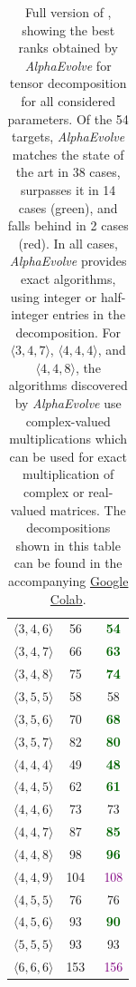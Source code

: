 \documentclass[logo,copyright,12pt]{googledeepmind}
\theoremstyle{definition}
\theoremstyle{remark}
\theoremstyle{plain}
\newcommand{\ResultsColabURL}{https://colab.research.google.com/github/google-deepmind/alphaevolve\_results/blob/master/mathematical\_results.ipynb}
\newcommand{\ResultsColab}{the accompanying \href{\ResultsColabURL}{Google Colab}}
\newcommand{\method}{\emph{AlphaEvolve}\xspace}
\begin{document}
\begin{table}[h]
\begin{center}
{\begin{tabular}{ccc}
    $\langle 3, 4, 6 \rangle$ & 56~\citep{Kauers_2025} & \textcolor{darkgreen}{\textbf{54}} \\ 
    $\langle 3, 4, 7 \rangle$ & 66~\citep{smirnov2021} & \textcolor{darkgreen}{\textbf{63}} \\ 
    $\langle 3, 4, 8 \rangle$ & 75~\citep{smirnov2021}   & \textcolor{darkgreen}{\textbf{74}} \\ 
    $\langle 3, 5, 5 \rangle$ & 58~\citep{smirnov2021} & 58 \\ 
    $\langle 3, 5, 6 \rangle$ & 70~\citep{Kauers_2025} & \textcolor{darkgreen}{\textbf{68}} \\
    $\langle 3, 5, 7 \rangle$ & 82~\citep{smirnov2021} & \textcolor{darkgreen}{\textbf{80}} \\ 
    $\langle 4, 4, 4 \rangle$ & 49~\citep{strassen1969gaussian} & \textcolor{darkgreen}{\textbf{48}}  \\ 
    $\langle 4, 4, 5 \rangle$ & 62~\citep{kauers2023flip}   & \textcolor{darkgreen}{\textbf{61}}    \\
    $\langle 4, 4, 6 \rangle$ & 73~\citep{Kauers_2025} & 73 \\ 
    $\langle 4, 4, 7 \rangle$ & 87~\citep{smirnov2013bilinear,strassen1969gaussian} & \textcolor{darkgreen}{\textbf{85}}    \\
    $\langle 4, 4, 8 \rangle$ & 98~\citep{strassen1969gaussian} & \textcolor{darkgreen}{\textbf{96}} \\ 
    $\langle 4, 4, 9 \rangle$ & 104~\citep{smirnov2022} & \textcolor{purple}{108} \\ 
    $\langle 4, 5, 5 \rangle$ & 76~\citep{fawzi2022discovering} & 76 \\ 
    $\langle 4, 5, 6 \rangle$ & 93~\citep{Kauers_2025}   & \textcolor{darkgreen}{\textbf{90}} \\ 
    $\langle 5, 5, 5 \rangle$ & 93~\citep{flip_graphs_with_symmetry} & 93 \\ 
    $\langle 6, 6, 6 \rangle$ & 153~\citep{flip_graphs_with_symmetry} & \textcolor{purple}{156} \\ 
    \end{tabular}
    }
\caption{Full version of , showing the best ranks obtained by \method for tensor decomposition for all considered parameters. Of the 54 targets, \method matches the state of the art in 38 cases, surpasses it in 14 cases (green), and falls behind in 2 cases (red). In all cases, \method provides exact algorithms, using integer or half-integer entries in the decomposition. For $\langle 3, 4, 7\rangle$, $\langle 4, 4, 4\rangle$, and $\langle 4, 4, 8\rangle$, the algorithms discovered by \method use complex-valued multiplications which can be used for exact multiplication of complex or real-valued matrices. The decompositions shown in this table can be found in \ResultsColab.}
    \label{tab:relaxed-opt-results-appendix}
\end{center}
\end{table}
\end{document}
